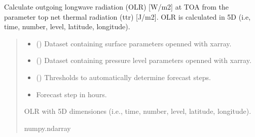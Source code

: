 \documentclass[a4paper,11pt,english]{sphinxmanual}
\begin{document}

\begin{fulllineitems}
\label{\detokenize{modules:envlib.processing_surf_vars.get_olr_5d}}
\pysigstartsignatures
{}
\pysigstopsignatures
\sphinxAtStartPar
Calculate outgoing longwave radiation (OLR) {[}W/m2{]} at TOA from the parameter top net thermal radiation (ttr)
{[}J/m2{]}. OLR is calculated in 5D (i.e, time, number, level, latitude, longitude).
\begin{quote}\begin{description}
\begin{itemize}
\item {} 
\sphinxAtStartPar
{} () \textendash{} Dataset containing surface parameters openned with xarray.

\item {} 
\sphinxAtStartPar
{} () \textendash{} Dataset containing pressure level parameters openned with xarray.

\item {} 
\sphinxAtStartPar
{} () \textendash{} Thresholds to automatically determine forecast steps.

\item {} 
\sphinxAtStartPar
{} \textendash{} Forecast step in hours.

\end{itemize}

\sphinxAtStartPar
OLR with 5D dimensiones (i.e., time, number, level, latitude, longitude).

\sphinxAtStartPar
numpy.ndarray

\end{description}\end{quote}

\end{fulllineitems}
\end{document}
